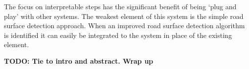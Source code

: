 \documentclass[]{aiaa-tc}%
\begin{document}
The focus on interpretable steps has the significant benefit of being `plug and play' with other systems. The weakest element of this system is the simple road surface detection approach. When an improved road surface detection algorithm is identified it can easily be integrated to the system in place of the existing element. 

\textbf{TODO: Tie to intro and abstract. Wrap up}

\newpage

%
%
%
%
\end{document}
